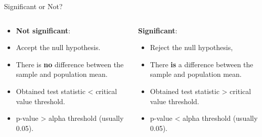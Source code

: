 \documentclass[
  ignorenonframetext,
]{beamer}
\providecommand{\tightlist}{%
  \setlength{\itemsep}{0pt}\setlength{\parskip}{0pt}}
\begin{document}
\begin{frame}{Significant or Not?}
\label{significant-or-not}
\begin{columns}[T]
\begin{column}{0.5\textwidth}
\begin{itemize}
\item
  \textbf{Not significant}: \vspace{1cm}
\item
  Accept the null hypothesis.
\end{itemize}

\begin{itemize}
\tightlist
\item
  There is \textbf{no} difference between the sample and population
  mean.
\end{itemize}

\begin{itemize}
\tightlist
\item
  Obtained test statistic \textless{} critical value threshold.
\end{itemize}

\begin{itemize}
\tightlist
\item
  p-value \textgreater{} alpha threshold (usually 0.05).
\end{itemize}
\end{column}

\begin{column}{0.5\textwidth}
\textbf{Significant}: \vspace{1cm}

\begin{itemize}
\tightlist
\item
  Reject the null hypothesis,
\end{itemize}

\begin{itemize}
\tightlist
\item
  There \textbf{is} a difference between the sample and population mean.
\end{itemize}

\begin{itemize}
\tightlist
\item
  Obtained test statistic \textgreater{} critical value threshold.
\end{itemize}

\begin{itemize}
\tightlist
\item
  p-value \textless{} alpha threshold (usually 0.05).
\end{itemize}
\end{column}
\end{columns}
\end{frame}
\end{document}

